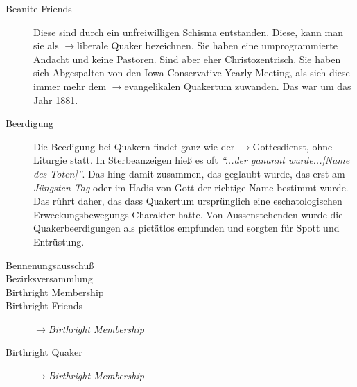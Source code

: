 \begin{description}
 \item[Beanite Friends]
 Diese sind durch ein unfreiwilligen Schisma entstanden. Diese, kann man sie als $\to$liberale Quaker bezeichnen. Sie haben eine umprogrammierte Andacht und keine Pastoren. Sind aber eher Christozentrisch. Sie haben sich Abgespalten von den Iowa Conservative Yearly Meeting, als sich diese immer mehr dem $\to$evangelikalen Quakertum zuwanden. Das war um das Jahr 1881.
  


 \item[Beerdigung] Die Beedigung bei Quakern findet ganz wie der $\to$Gottesdienst, ohne Liturgie statt. In Sterbeanzeigen hieß es oft \textit{"`...der ganannt wurde...[Name des Toten]"'}. Das hing damit zusammen, das geglaubt wurde, das erst am \textit{Jüngsten Tag} oder im Hadis von Gott der richtige Name bestimmt wurde. Das rührt daher, das dass Quakertum ursprünglich eine eschatologischen Erweckungsbewegungs-Charakter hatte. Von Aussenstehenden wurde die Quakerbeerdigungen als pietätlos empfunden und sorgten für Spott und Entrüstung.  

 \item[Bennenungsausschuß]
 
 \item[Bezirksversammlung]
 
 \item[Birthright Membership]
 
 \item[Birthright Friends] $\to$\textit{Birthright Membership}
 
 \item[Birthright Quaker] $\to$\textit{Birthright Membership}


\end{description}
